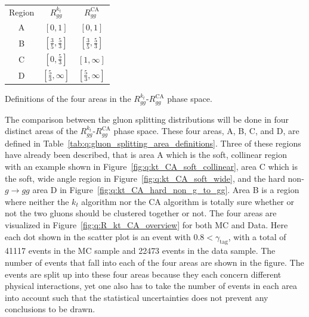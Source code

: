 \begin{margintable}[1cm]
  \centerfloat
  \begin{tabular}{@{}ccc@{}}
  Region  & $R_{gg}^{k_t}$                & $R_{gg}^\mathrm{CA}$    \\ \addlinespace[0.1em] \midrule \addlinespace[0.4em]
  A       & $[0, 1]$                      & $[0, 1]$                \\ \addlinespace[0.4em]
  B       & $[\frac{3}{5}, \frac{5}{3}]$  & $[\frac{3}{5}, \frac{5}{3}]$            \\ \addlinespace[0.4em]
  C       & $[0, \frac{5}{3}]$            & $[1, \infty]$           \\ \addlinespace[0.4em]
  D       & $[\frac{5}{3}, \infty]$       & $[\frac{5}{3}, \infty]$
  \end{tabular}
\vspace{1mm}
\caption[Area Definition in the $R_{gg}^{k_t}$-$R_{gg}^\mathrm{CA}$ Phase Space]{\label{tab:q:gluon_splitting_area_definitions}Definitions of the four areas in the $R_{gg}^{k_t}$-$R_{gg}^\mathrm{CA}$ phase space.}
\end{margintable}

The comparison between the gluon splitting distributions will be done in four distinct areas of the $R_{gg}^{k_t}$-$R_{gg}^\mathrm{CA}$ phase space. These four areas, A, B, C, and D, are defined in Table~\ref{tab:q:gluon_splitting_area_definitions}. Three of these regions have already been described, that is area A which is the soft, collinear region with an example shown in Figure~\ref{fig:q:kt_CA_soft_collinear}, area C which is the soft, wide angle region in Figure~\ref{fig:q:kt_CA_soft_wide}, and the hard non-$g\rightarrow gg$ area D in Figure~\ref{fig:q:kt_CA_hard_non_g_to_gg}. Area B is a region where neither the $k_t$ algorithm nor the CA algorithm is totally sure whether or not the two gluons should be clustered together or not. The four areas are visualized in Figure~\ref{fig:q:R_kt_CA_overview} for both MC and Data. Here each dot shown in the scatter plot is an event with $0.8 < \gamma_\mathrm{tag}$, with a total of \num{41117} events in the MC sample and \num{22473} events in the data sample. The number of events that fall into each of the four areas are shown in the figure. The events are split up into these four areas because they each concern different physical interactions, yet one also has to take the number of events in each area into account such that the statistical uncertainties does not prevent any conclusions to be drawn.

